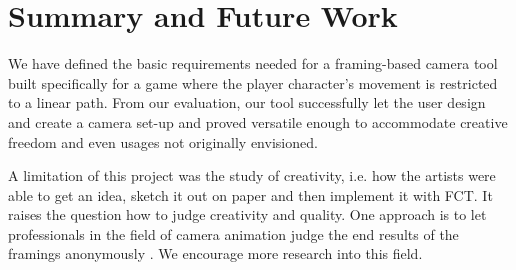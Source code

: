 \section{Summary and Future Work}
We have defined the basic requirements needed for a framing-based camera tool built specifically for a game where the player character's movement is restricted to a linear path. From our evaluation, our tool successfully let the user design and create a camera set-up and proved versatile enough to accommodate creative freedom and even usages not originally envisioned. 

A limitation of this project was the study of creativity, i.e. how the artists were able to get an idea, sketch it out on paper and then implement it with FCT. It raises the question how to judge creativity and quality. One approach is to let professionals in the field of camera animation judge the end results of the framings anonymously \cite{sadeghi_artist_2010}. We encourage more research into this field.